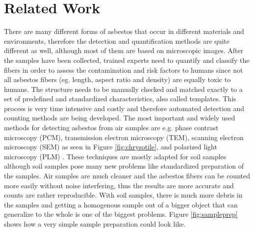 \section{Related Work}

There are many different forms of asbestos that occur in different materials and environments, therefore the detection and quantification methods are quite different as well, although most of them are based on microscopic images. After the samples have been collected, trained experts need to quantify and classify the fibers in order to assess the contamination and risk factors to humans since not all asbestos fibers (eg. length, aspect ratio and density) are equally toxic to humans. The structure needs to be manually checked and matched exactly to a set of predefined and standardized characteristics, also called templates. This process is very time intensive and costly and therefore automated detection and counting methods are being developed. The most important and widely used methods for detecting asbestos from air samples are e.g. phase contrast microscopy (PCM), transmission electron microscopy (TEM), scanning electron microscopy (SEM) as seen in Figure \ref{fig:chrysotile}, and polarized light microscopy (PLM) \cite{perry2004discussion}. These techniques are mostly adapted for soil samples although soil samples pose many new problems like standardized preparation of the samples. Air samples are much cleaner and the asbestos fibers can be counted more easily without noise interfering, thus the results are more accurate and counts are rather reproducible. With soil samples, there is much more debris in the samples and getting a homogenous sample out of a bigger object that can generalize to the whole is one of the biggest problems. Figure \ref{fig:sampleprep} shows how a very simple sample preparation could look like. \\

